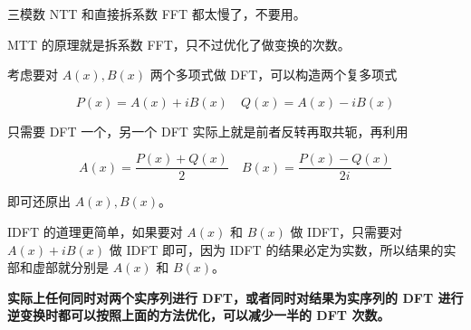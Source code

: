 三模数 NTT 和直接拆系数 FFT 都太慢了，不要用。

MTT 的原理就是拆系数 FFT，只不过优化了做变换的次数。

考虑要对 $A(x), B(x)$ 两个多项式做 DFT，可以构造两个复多项式

$$ P(x) = A(x) + iB(x) \quad Q(x) = A(x) - iB(x) $$

只需要 DFT 一个，另一个 DFT 实际上就是前者反转再取共轭，再利用

$$ A(x) = \frac {P(x) + Q(x)} 2 \quad B(x) = \frac {P(x) - Q(x)} {2i} $$

即可还原出 $A(x), B(x)$。

IDFT 的道理更简单，如果要对 $A(x)$ 和 $B(x)$ 做 IDFT，只需要对 $A(x) + i B(x)$ 做 IDFT 即可，因为 IDFT 的结果必定为实数，所以结果的实部和虚部就分别是 $A(x)$ 和 $B(x)$。

\textbf{实际上任何同时对两个实序列进行 DFT，或者同时对结果为实序列的 DFT 进行逆变换时都可以按照上面的方法优化，可以减少一半的 DFT 次数。}

\inputminted{cpp}{../src/math/MTT.cpp}

